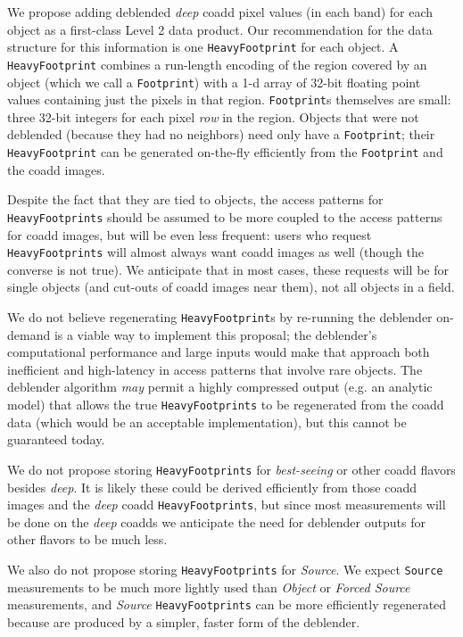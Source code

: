 \documentclass[DM,lsstdraft,toc]{lsstdoc}
\begin{document}
We propose adding deblended \emph{deep} coadd pixel values (in each band) for each object as a first-class Level 2 data product.  Our recommendation for the data structure for this information is one \texttt{HeavyFootprint} for each object.  A \texttt{HeavyFootprint} combines a run-length encoding of the region covered by an object (which we call a \texttt{Footprint}) with a 1-d array of 32-bit floating point values containing just the pixels in that region.  \texttt{Footprint}s themselves are small: three 32-bit integers for each pixel \emph{row} in the region.  Objects that were not deblended (because they had no neighbors) need only have a \texttt{Footprint}; their \texttt{HeavyFootprint} can be generated on-the-fly efficiently from the \texttt{Footprint} and the coadd images.

Despite the fact that they are tied to objects, the access patterns for \texttt{HeavyFootprints} should be assumed to be more coupled to the access patterns for coadd images, but will be even less frequent: users who request \texttt{HeavyFootprints} will almost always want coadd images as well (though the converse is not true).  We anticipate that in most cases, these requests will be for single objects (and cut-outs of coadd images near them), not all objects in a field.

We do not believe regenerating \texttt{HeavyFootprint}s by re-running the deblender on-demand is a viable way to implement this proposal; the deblender's computational performance and large inputs would make that approach both inefficient and high-latency in access patterns that involve rare objects.  The deblender algorithm \emph{may} permit a highly compressed output (e.g. an analytic model) that allows the true \texttt{HeavyFootprints} to be regenerated from the coadd data (which would be an acceptable implementation), but this cannot be guaranteed today.

We do not propose storing \texttt{HeavyFootprints} for \emph{best-seeing} or other coadd flavors besides \emph{deep}.  It is likely these could be derived efficiently from those coadd images and the \emph{deep} coadd \texttt{HeavyFootprints}, but since most measurements will be done on the \emph{deep} coadds we anticipate the need for deblender outputs for other flavors to be much less.

We also do not propose storing \texttt{HeavyFootprints} for \emph{Source}.  We expect \texttt{Source} measurements to be much more lightly used than \emph{Object} or \emph{Forced Source} measurements, and \emph{Source} \texttt{HeavyFootprints} can be more efficiently regenerated because are produced by a simpler, faster form of the deblender.
\end{document}
